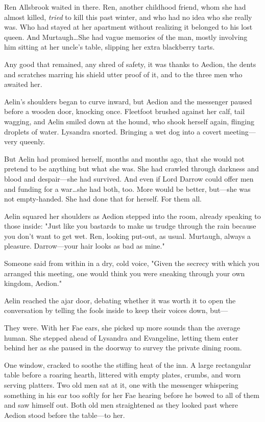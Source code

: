 Ren Allsbrook waited in there. 
Ren, another childhood friend, whom she had almost killed, \emph{tried} to kill this past winter, and who had no idea who she really was. 
Who had stayed at her apartment without realizing it belonged to his lost queen. 
And Murtaugh\ldots She had vague memories of the man, mostly involving him sitting at her uncle's table, slipping her extra blackberry tarts.

Any good that remained, any shred of safety, it was thanks to Aedion, the dents and scratches marring his shield utter proof of it, and to the three men who awaited her.

Aelin's shoulders began to curve inward, but Aedion and the messenger paused before a wooden door, knocking once. 
Fleetfoot brushed against her calf, tail wagging, and Aelin smiled down at the hound, who shook herself again, flinging droplets of water. 
Lysandra snorted. 
Bringing a wet dog into a covert meeting---very queenly.

But Aelin had promised herself, months and months ago, that she would not pretend to be anything but what she was.
She had crawled through darkness and blood and despair---she had survived.
And even if Lord Darrow could offer men and funding for a war\ldots she had both, too. 
More would be better, but---she was not empty-handed. 
She had done that for herself. 
For them all.

Aelin squared her shoulders as Aedion stepped into the room, already speaking to those inside: "Just like you bastards to make us trudge through the rain because you don't want to get wet. 
Ren, looking put-out, as usual.
Murtaugh, always a pleasure.
Darrow---your hair looks as bad as mine."

Someone said from within in a dry, cold voice, "Given the secrecy with which you arranged this meeting, one would think you were sneaking through your own kingdom, Aedion."

Aelin reached the ajar door, debating whether it was worth it to open the conversation by telling the fools inside to keep their voices down, but---

They were. 
With her Fae ears, she picked up more sounds than the average human. 
She stepped ahead of Lysandra and Evangeline, letting them enter behind her as she paused in the doorway to survey the private dining room.

One window, cracked to soothe the stifling heat of the inn. 
A large rectangular table before a roaring hearth, littered with empty plates, crumbs, and worn serving platters. 
Two old men sat at it, one with the messenger whispering something in his ear too softly for her Fae hearing before he bowed to all of them and saw himself out. 
Both old men straightened as they looked past where Aedion stood before the table---to her.

